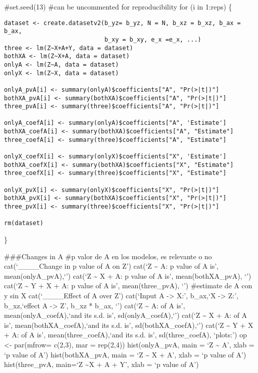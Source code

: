 \documentclass[
]{article}
\begin{document}
\#set.seed(13) \#can be uncommented for reproducibility for (i in
1:reps) \{

\begin{verbatim}
dataset <- create.datasetv2(b_yz= b_yz, N = N, b_xz = b_xz, b_ax = b_ax,
                            b_xy = b_xy, e_x =e_x, ...)
three <- lm(Z~X+A+Y, data = dataset)
bothXA <- lm(Z~X+A, data = dataset)
onlyA <- lm(Z~A, data = dataset)
onlyX <- lm(Z~X, data = dataset)

onlyA_pvA[i] <- summary(onlyA)$coefficients["A", "Pr(>|t|)"]
bothXA_pvA[i] <- summary(bothXA)$coefficients["A", "Pr(>|t|)"]
three_pvA[i] <- summary(three)$coefficients["A", "Pr(>|t|)"]

onlyA_coefA[i] <- summary(onlyA)$coefficients["A", 'Estimate']
bothXA_coefA[i] <- summary(bothXA)$coefficients["A", "Estimate"]
three_coefA[i] <- summary(three)$coefficients["A", "Estimate"]

onlyX_coefX[i] <- summary(onlyX)$coefficients["X", 'Estimate']
bothXA_coefX[i] <- summary(bothXA)$coefficients["X", "Estimate"]
three_coefX[i] <- summary(three)$coefficients["X", "Estimate"]

onlyX_pvX[i] <- summary(onlyX)$coefficients["X", "Pr(>|t|)"]
bothXA_pvX[i] <- summary(bothXA)$coefficients["X", "Pr(>|t|)"]
three_pvX[i] <- summary(three)$coefficients["X", "Pr(>|t|)"]

rm(dataset)
\end{verbatim}

\}

\#\#\#Changes in A \#p valor de A en los modelos, es relevante o no
cat(`\n\_\_\_\_Change in p value of A on Z\n') cat(`\nWhen Z
\textasciitilde{} A: \nThe p value of A is', mean(onlyA\_pvA),`\n')
cat(`\nWhen Z \textasciitilde{} X + A: \nThe p value of A is',
mean(bothXA\_pvA), `\n') cat(`\nWhen Z \textasciitilde{} Y + X + A:
\nThe p value of A is', mean(three\_pvA), `\n') \#estimate de A con y
sin X cat(`\n\_\_\_\_Effect of A over Z\n') cat(`Input A -\textgreater{}
X:', b\_ax,`\nInput X -\textgreater{} Z:', b\_xz,`\nTotal effect A
-\textgreater{} Z', b\_xz * b\_ax, `\n') cat(`\nWhen Z \textasciitilde{}
A: \nCoefficient of A is', mean(onlyA\_coefA),`and its s.d. is',
sd(onlyA\_coefA),`\n') cat(`\nWhen Z \textasciitilde{} X + A:
\nCoefficient of A is', mean(bothXA\_coefA),`and its s.d. is',
sd(bothXA\_coefA),`\n') cat(`\nWhen Z \textasciitilde{} Y + X + A:
\nCoefficient of A is', mean(three\_coefA),`and its s.d. is',
sd(three\_coefA), `\nSee plots:\n') op \textless- par(mfrow= c(2,3), mar
= rep(2,4)) hist(onlyA\_pvA, main = `Z \textasciitilde{} A', xlab = `p
value of A') hist(bothXA\_pvA, main = `Z \textasciitilde{} X + A', xlab
= `p value of A') hist(three\_pvA, main=`Z \textasciitilde X + A + Y',
xlab = `p value of A')
\end{document}

